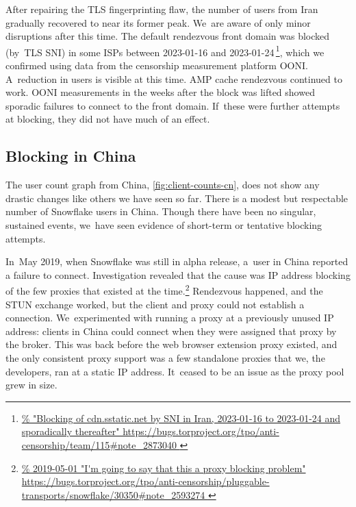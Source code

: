 \documentclass[letterpaper,twocolumn]{article}
\newlength{\urlfootnotesize}
\newcommand{\urlfootnote}[1]{\footnote{
\raggedright\hangindent\footnotemargin%
\fontsize{\urlfootnotesize}{\urlfootnotesize}\selectfont%
\url{#1}
}}
\begin{document}
After repairing the TLS fingerprinting flaw,
the number of users from Iran gradually recovered
to near its former peak.
We~are aware of only minor disruptions after this time.
The default rendezvous front domain
was blocked (by~TLS SNI) in some ISPs
between \mbox{2023-01-16} and \mbox{2023-01-24}\,\urlfootnote{
https://bugs.torproject.org/tpo/anti-censorship/team/115\#note_2873040
},
which we confirmed using data from the censorship measurement platform OONI.
A~reduction in users is visible at this time.
AMP cache rendezvous continued to work.
OONI measurements in the weeks after the block was lifted showed sporadic
failures to connect to the front domain.
If~these were further attempts at blocking,
they did not have much of an effect.

\subsection{Blocking in China}
\label{sec:block-cn}


The user count graph from China,
\autoref{fig:client-counts-cn},
does not show any drastic changes
like others we have seen so far.
There is a modest but respectable number of Snowflake users in China.
Though there have been no singular, sustained events,
we~have seen evidence of short-term or tentative
blocking attempts.

In~May 2019, when Snowflake was still in alpha release,
a~user in China reported a failure to connect.
Investigation revealed that the cause was IP address blocking of
the few proxies that existed at the time.\urlfootnote{
https://bugs.torproject.org/tpo/anti-censorship/pluggable-transports/snowflake/30350\#note_2593274
}
Rendezvous happened, and the STUN exchange worked,
but the client and proxy could not establish a connection.
We~experimented with running a proxy
at a previously unused IP address:
clients in China could connect when they were assigned
that proxy by the broker.
This was back before the web browser extension proxy existed,
and the only consistent proxy support was a few standalone proxies
that we, the developers, ran at a static IP address.
It~ceased to be an issue as the proxy pool grew in size.
\end{document}
